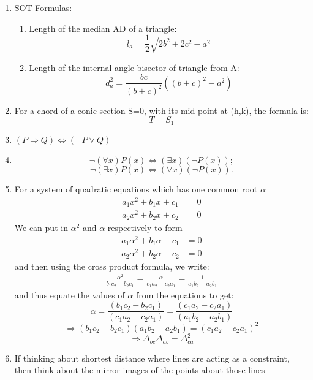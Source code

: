 \documentclass{article}
\numberwithin{equation}{section}
\numberwithin{figure}{section}
\begin{document}
\begin{enumerate}
		\item SOT Formulas:
		\begin{enumerate}
			\item Length of the median AD of a triangle:
				\begin{equation}
					l_{a}=\frac{1}{2}\sqrt{2b^2+2c^2-a^2}
				\end{equation}
			\item Length of the internal angle bisector of triangle from A:
				\begin{equation}
					d^2_{a}=\frac{bc}{(b+c)^2}\left((b+c)^2-a^2\right)
				\end{equation}
		\end{enumerate}
		\item For a chord of a conic section S=0, with its mid point at (h,k), the formula is:
			\begin{equation}
				T=S_1
			\end{equation}
		\item $(P\Rightarrow Q)\Leftrightarrow(\neg P \vee Q)$
		\item \begin{equation}
				  \neg (\forall x) P(x) \Leftrightarrow (\exists x)(\neg P(x));
			\end{equation}
			  \begin{equation}
				    \neg (\exists x) P(x) \Leftrightarrow (\forall x)(\neg P(x)).
			  \end{equation}
		\item For a system of quadratic equations which has one common root $\alpha$
			\begin{align}
				a_1 x^2 + b_1 x + c_1 &=0\\
				a_2 x^2 + b_2 x + c_2 &=0
			\end{align}
			We can put in $\alpha^2$ and $\alpha$ respectively to form
			\begin{align}
				a_1 \alpha^2 + b_1 \alpha + c_1 &=0\\
				a_2 \alpha^2 + b_2 \alpha + c_2 &=0
			\end{align}
			and then using the cross product formula, we write:
			\begin{align}
				\frac{\alpha^2}{b_1 c_2-b_2 c_1}=\frac{\alpha}{c_1 a_2-c_2 a_1}=\frac{1}{a_1 b_2 - a_2 b_1}
			\end{align}
			and thus equate the values of $\alpha$ from the equations to get:
			\begin{equation}
				\alpha=\frac{(b_1 c_2 - b_2 c_1)}{(c_1 a_2 - c_2 a_1)}=\frac{(c_1 a_2 - c_2 a_1)}{(a_1 b_2 - a_2 b_1)}
			\end{equation}
			\begin{equation}
				\Rightarrow (b_1 c_2 - b_2 c_1)(a_1 b_2 - a_2 b_1)=(c_1 a_2 - c_2 a_1 )^2
			\end{equation}
			\begin{equation}
				\Rightarrow \boxed{\Delta_{bc} \Delta_{ab}=\Delta^2_{ca}}
			\end{equation}
		\item If thinking about shortest distance where lines are acting as a constraint, then think about the mirror images of the points about those lines			
\end{enumerate}
\end{document}
